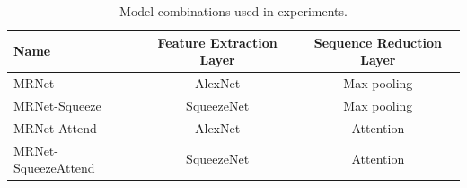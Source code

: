 \documentclass[10pt,twocolumn,letterpaper]{article}
\begin{document}










\begin{table}
\begin{center}
\begin{tabular}{|l|c|c|}
\hline
Name & Feature Extraction Layer & Sequence Reduction Layer \\
\hline
MRNet & AlexNet & Max pooling \\
MRNet-Squeeze & SqueezeNet & Max pooling \\
MRNet-Attend & AlexNet & Attention \\
MRNet-SqueezeAttend & SqueezeNet & Attention \\
\hline
\end{tabular}
\end{center}
\caption{Model combinations used in experiments.}
\label{tab:models}
\end{table}
\end{document}
